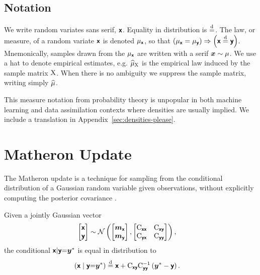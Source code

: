 \documentclass[wcp]{jmlr} %
\begin{document}
\subsection{Notation}

We write random variates sans serif, $\boldsymbol{\mathsf{x}}$.
Equality in distribution is $\stackrel{\mathrm{d}}{=}$.
The law, or measure, of a random variate $\boldsymbol{\mathsf{x}}$ is denoted $\Law[\vrv{x}]$,
so that $\left(\Law[\vrv{x}]=\Law[\vrv{y}]\right) \Rightarrow \left(\vrv{x}\disteq\vrv{y}\right)$.
Mnemonically, samples drawn from the $\Law[\vrv{x}]$ are written with a serif $\vv{x}\sim\Law$.
We use a hat to denote empirical estimates, e.g. \(\ELaw[\mm{X}]\) is the empirical law induced by the sample matrix \(\mathrm{X}\).
When there is no ambiguity we suppress the sample matrix, writing simply \(\widehat{\Law}\).

This measure notation from probability theory is unpopular in both machine learning and data assimilation contexts where densities are usually implied.
We include a translation in Appendix~\ref{sec:densities-please}.

\section{Matheron Update}

The Matheron update is a technique for sampling from the conditional distribution of a Gaussian random variable given observations, without explicitly computing the posterior covariance \citep{Doucet2010Note,Wilson2020Efficiently,Wilson2021Pathwise}.

\begin{lemma}
Given a jointly Gaussian vector
\begin{align}
    \begin{bmatrix} \boldsymbol{\mathsf{x}} \\ \boldsymbol{\mathsf{y}} \end{bmatrix}
    &\sim \mathcal{N}\left(\begin{bmatrix} \boldsymbol{m}_{\boldsymbol{\mathsf{x}}} \\ \boldsymbol{m}_{\boldsymbol{\mathsf{y}}} \end{bmatrix}, \begin{bmatrix} \mathrm{C}_{\boldsymbol{\mathsf{xx}}} & \mathrm{C}_{\boldsymbol{\mathsf{xy}}} \\ \mathrm{C}_{\boldsymbol{\mathsf{yx}}} & \mathrm{C}_{\boldsymbol{\mathsf{yy}}} \end{bmatrix}\right), \label{eq:joint-gaussian}
\end{align}
the conditional $\boldsymbol{\mathsf{x}} | \boldsymbol{\mathsf{y}} {=} \boldsymbol{y}^*$ is equal in distribution to
\begin{align}
    \left(\boldsymbol{\mathsf{x}} \mid \boldsymbol{\mathsf{y}} {=} \boldsymbol{y}^*\right)
    &\stackrel{\mathrm{d}}{=} \boldsymbol{\mathsf{x}} + \mathrm{C}_{\boldsymbol{\mathsf{xy}}} \mathrm{C}_{\boldsymbol{\mathsf{yy}}}^{-1} \left( \boldsymbol{y}^* - \boldsymbol{\mathsf{y}} \right).
    \label{eq:matheron-update}
\end{align}
\end{lemma}
\end{document}
